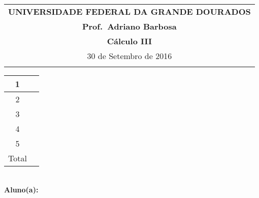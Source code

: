\documentclass[a4paper,5pt]{amsbook}
\begin{document}
\thispagestyle{empty}
\begin{minipage}[b]{0.45\linewidth}
\begin{tabular}{c}
\toprule{}
{{\bf UNIVERSIDADE FEDERAL DA GRANDE DOURADOS}}\\
{{\bf Prof.\ Adriano Barbosa}}\\



{{\bf C\'alculo III}}\\

\midrule{}
\hspace{8cm}30 de Setembro de 2016 \\
\bottomrule{}
\end{tabular}
%
\end{minipage} \hfill
\begin{minipage}[b]{0.58\linewidth}
\begin{flushright}
\def\arraystretch{1.2}
\begin{tabular}{|c|c|}  %
\hline\hline  %
1 & \hspace{1.2cm} \\
\hline  %
2& \\
\hline  %
3& \\
\hline  %
4&  \\
\hline  %
5&  \\
\hline  %
{\small Total}&  \\
\hline\hline  %
\end{tabular}
\end{flushright}
\end{minipage} \hfill
\vspace{0.3cm}\\
{\bf Aluno(a):}\dotfill{} \\  %
\end{document}
